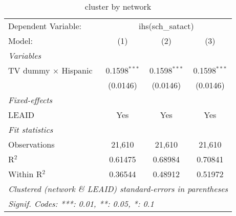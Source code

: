 \begin{table}[htbp]
\centering
\caption{cluster by network}
\begin{tabular}{lccc}
\tabularnewline\midrule\midrule
Dependent Variable:&\multicolumn{3}{c}{ihs(sch\_satact)}\\
Model:&(1) & (2) & (3)\\
\midrule \emph{Variables}&   &   &  \\
TV dummy $\times$ Hispanic & 0.1598$^{***}$ & 0.1598$^{***}$ & 0.1598$^{***}$\\
  &(0.0146) & (0.0146) & (0.0146)\\
\midrule \emph{Fixed-effects}&   &   &  \\
LEAID & Yes & Yes & Yes\\
\midrule \emph{Fit statistics}&  & & \\
Observations & 21,610&21,610&21,610\\
R$^2$ & 0.61475&0.68984&0.70841\\
Within R$^2$ & 0.36544&0.48912&0.51972\\
\midrule\midrule\multicolumn{4}{l}{\emph{Clustered (network \& LEAID) standard-errors in parentheses}}\\
\multicolumn{4}{l}{\emph{Signif. Codes: ***: 0.01, **: 0.05, *: 0.1}}\\
\end{tabular}
\end{table}

